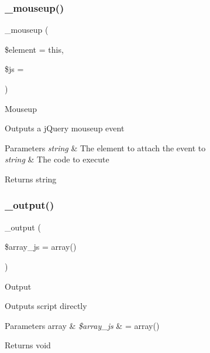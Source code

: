 \subsubsection{\texorpdfstring{\+\_\+mouseup()}{\_mouseup()}}
{\footnotesize\ttfamily \+\_\+mouseup (\begin{DoxyParamCaption}\item[{}]{\$element = {\ttfamily \textquotesingle{}this\textquotesingle{}},  }\item[{}]{\$js = {\ttfamily \textquotesingle{}\textquotesingle{}} }\end{DoxyParamCaption})\hspace{0.3cm}{\ttfamily [protected]}}

Mouseup

Outputs a j\+Query mouseup event


\begin{DoxyParams}{Parameters}
{\em string} & The element to attach the event to \\
\hline
{\em string} & The code to execute \\
\hline
\end{DoxyParams}
\begin{DoxyReturn}{Returns}
string 
\end{DoxyReturn}
\mbox{\label{class_c_i___jquery_a6a837913fb7adb3e611aa97a89d56a6e}} 
\subsubsection{\texorpdfstring{\+\_\+output()}{\_output()}}
{\footnotesize\ttfamily \+\_\+output (\begin{DoxyParamCaption}\item[{}]{\$array\+\_\+js = {\ttfamily array()} }\end{DoxyParamCaption})\hspace{0.3cm}{\ttfamily [protected]}}

Output

Outputs script directly


\begin{DoxyParams}[1]{Parameters}
array & {\em \$array\+\_\+js} & = array() \\
\hline
\end{DoxyParams}
\begin{DoxyReturn}{Returns}
void 
\end{DoxyReturn}
\mbox{\label{class_c_i___jquery_a6dd4fcc0640975784e69d1ea11eba291}} 
